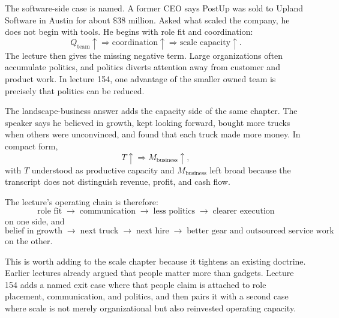 \documentclass[11pt,oneside]{book}
\begin{document}
The software-side case is named. A former CEO says PostUp was sold to Upland Software in Austin for about \(\$38\) million. Asked what scaled the company, he does not begin with tools. He begins with role fit and coordination:
\begin{equation}
Q_{\text{team}} \uparrow
\Rightarrow
\text{coordination} \uparrow
\Rightarrow
\text{scale capacity} \uparrow.
\end{equation}
The lecture then gives the missing negative term. Large organizations often accumulate politics, and politics diverts attention away from customer and product work. In lecture 154, one advantage of the smaller owned team is precisely that politics can be reduced.

The landscape-business answer adds the capacity side of the same chapter. The speaker says he believed in growth, kept looking forward, bought more trucks when others were unconvinced, and found that each truck made more money. In compact form,
\begin{equation}
T \uparrow \Rightarrow M_{\text{business}} \uparrow,
\end{equation}
with \(T\) understood as productive capacity and \(M_{\text{business}}\) left broad because the transcript does not distinguish revenue, profit, and cash flow.

The lecture's operating chain is therefore:
\[
\text{role fit}
\;\longrightarrow\;
\text{communication}
\;\longrightarrow\;
\text{less politics}
\;\longrightarrow\;
\text{clearer execution}
\]
on one side, and
\[
\text{belief in growth}
\;\longrightarrow\;
\text{next truck}
\;\longrightarrow\;
\text{next hire}
\;\longrightarrow\;
\text{better gear and outsourced service work}
\]
on the other.

This is worth adding to the scale chapter because it tightens an existing doctrine. Earlier lectures already argued that people matter more than gadgets. Lecture 154 adds a named exit case where that people claim is attached to role placement, communication, and politics, and then pairs it with a second case where scale is not merely organizational but also reinvested operating capacity.

\end{document}
